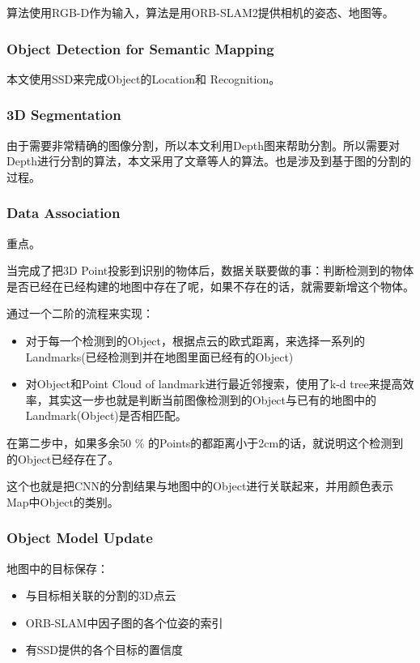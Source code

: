 算法使用RGB-D作为输入，算法是用ORB-SLAM2提供相机的姿态、地图等。

\subsubsection{Object Detection for Semantic Mapping}

本文使用SSD来完成Object的Location和 Recognition。

\subsubsection{3D Segmentation}

由于需要非常精确的图像分割，所以本文利用Depth图来帮助分割。所以需要对Depth进行分割的算法，本文采用了文章\cite{Felzenszwalb2004}\cite{Pham2016Geometrically}等人的算法。也是涉及到基于图的分割的过程。

\subsubsection{Data Association}

重点。

当完成了把3D Point投影到识别的物体后，数据关联要做的事：判断检测到的物体是否已经在已经构建的地图中存在了呢，如果不存在的话，就需要新增这个物体。

通过一个二阶的流程来实现：

\begin{itemize}
\item 对于每一个检测到的Object，根据点云的欧式距离，来选择一系列的Landmarks(已经检测到并在地图里面已经有的Object)
\item 对Object和Point Cloud of landmark进行最近邻搜索，使用了k-d tree来提高效率，其实这一步也就是判断当前图像检测到的Object与已有的地图中的Landmark(Object)是否相匹配。
\end{itemize}

在第二步中，如果多余50 \% 的Points的都距离小于2cm的话，就说明这个检测到的Object已经存在了。

这个也就是把CNN的分割结果与地图中的Object进行关联起来，并用颜色表示Map中Object的类别。

\subsubsection{Object Model Update}

地图中的目标保存：
\begin{itemize}
\item 与目标相关联的分割的3D点云
\item ORB-SLAM中因子图的各个位姿的索引
\item 有SSD提供的各个目标的置信度
\end{itemize}

